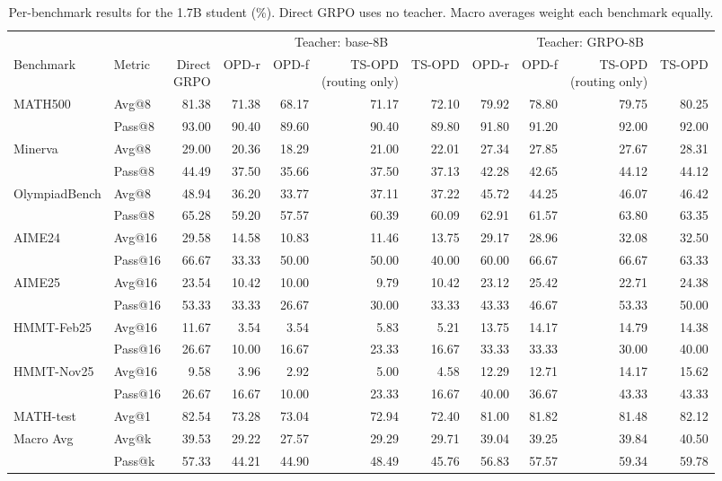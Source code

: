 \documentclass[10pt]{article}
\begin{document}
\begin{table}[h]
\centering
\scriptsize
\setlength{\tabcolsep}{3.5pt}
\caption{Per-benchmark results for the 1.7B student (\%). Direct GRPO uses no teacher. Macro averages weight each benchmark equally.}
\label{tab:app-full-17B}
\begin{tabular}{llrrrrrrrrr}
\toprule
 & & & \multicolumn{4}{c}{Teacher: base-8B} & \multicolumn{4}{c}{Teacher: GRPO-8B} \\
\cmidrule(lr){4-7}\cmidrule(lr){8-11}
Benchmark & Metric & \shortstack{Direct\\GRPO} & OPD-r & OPD-f & \shortstack{TS-OPD\\(routing only)} & TS-OPD & OPD-r & OPD-f & \shortstack{TS-OPD\\(routing only)} & TS-OPD \\
\midrule
MATH500 & Avg@8 & 81.38 & 71.38 & 68.17 & 71.17 & 72.10 & 79.92 & 78.80 & 79.75 & 80.25 \\
 & Pass@8 & 93.00 & 90.40 & 89.60 & 90.40 & 89.80 & 91.80 & 91.20 & 92.00 & 92.00 \\
Minerva & Avg@8 & 29.00 & 20.36 & 18.29 & 21.00 & 22.01 & 27.34 & 27.85 & 27.67 & 28.31 \\
 & Pass@8 & 44.49 & 37.50 & 35.66 & 37.50 & 37.13 & 42.28 & 42.65 & 44.12 & 44.12 \\
OlympiadBench & Avg@8 & 48.94 & 36.20 & 33.77 & 37.11 & 37.22 & 45.72 & 44.25 & 46.07 & 46.42 \\
 & Pass@8 & 65.28 & 59.20 & 57.57 & 60.39 & 60.09 & 62.91 & 61.57 & 63.80 & 63.35 \\
AIME24 & Avg@16 & 29.58 & 14.58 & 10.83 & 11.46 & 13.75 & 29.17 & 28.96 & 32.08 & 32.50 \\
 & Pass@16 & 66.67 & 33.33 & 50.00 & 50.00 & 40.00 & 60.00 & 66.67 & 66.67 & 63.33 \\
AIME25 & Avg@16 & 23.54 & 10.42 & 10.00 & 9.79 & 10.42 & 23.12 & 25.42 & 22.71 & 24.38 \\
 & Pass@16 & 53.33 & 33.33 & 26.67 & 30.00 & 33.33 & 43.33 & 46.67 & 53.33 & 50.00 \\
HMMT-Feb25 & Avg@16 & 11.67 & 3.54 & 3.54 & 5.83 & 5.21 & 13.75 & 14.17 & 14.79 & 14.38 \\
 & Pass@16 & 26.67 & 10.00 & 16.67 & 23.33 & 16.67 & 33.33 & 33.33 & 30.00 & 40.00 \\
HMMT-Nov25 & Avg@16 & 9.58 & 3.96 & 2.92 & 5.00 & 4.58 & 12.29 & 12.71 & 14.17 & 15.62 \\
 & Pass@16 & 26.67 & 16.67 & 10.00 & 23.33 & 16.67 & 40.00 & 36.67 & 43.33 & 43.33 \\
MATH-test & Avg@1 & 82.54 & 73.28 & 73.04 & 72.94 & 72.40 & 81.00 & 81.82 & 81.48 & 82.12 \\
\midrule
Macro Avg & Avg@k & 39.53 & 29.22 & 27.57 & 29.29 & 29.71 & 39.04 & 39.25 & 39.84 & 40.50 \\
 & Pass@k & 57.33 & 44.21 & 44.90 & 48.49 & 45.76 & 56.83 & 57.57 & 59.34 & 59.78 \\
\bottomrule
\end{tabular}
\end{table}
\end{document}
